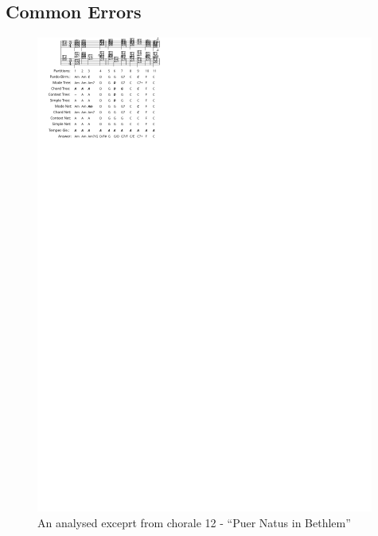\documentclass{article}
\begin{document}
\subsection{Common Errors}


\begin{figure}
  \centering
  \includegraphics[scale=4]{coral-012}
  \caption{An analysed exceprt from chorale 12 - ``Puer Natus in Bethlem''}
  \label{fig:coral-12}
\end{figure}
\end{document}

